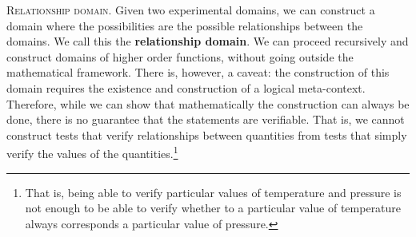 \documentclass[10pt,twocolumn, nofootinbib]{revtex4-1}
\newcommand\partitle[1]{\textsc{#1}.}
\begin{document}
\partitle{Relationship domain} Given two experimental domains, we can construct a domain where the possibilities are the possible relationships between the domains. We call this the \textbf{relationship domain}. We can proceed recursively and construct domains of higher order functions, without going outside the mathematical framework. There is, however, a caveat: the construction of this domain requires the existence and construction of a logical meta-context. Therefore, while we can show that mathematically the construction can always be done, there is no guarantee that the statements are verifiable. That is, we cannot construct tests that verify relationships between quantities from tests that simply verify the values of the quantities.\footnote{That is, being able to verify particular values of temperature and pressure is not enough to be able to verify whether to a particular value of temperature always corresponds a particular value of pressure.}


\end{document}
